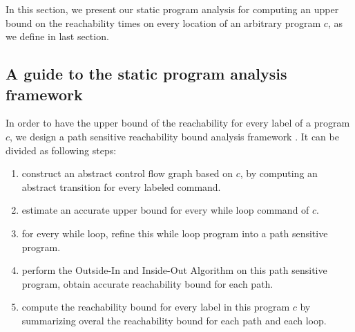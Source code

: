 In this section, we present our static program analysis for computing an upper bound on the 
reachability times on every location of an arbitrary program $c$, as we define in last section.
%
\subsection{A guide to the static program analysis framework}
In order to have the upper bound of the  reachability for every label of a program $c$, we design 
a path sensitive reachability bound analysis framework {\THESYSTEM}.
It can be divided as following steps: 
%
%
\begin{enumerate}
\item  construct an abstract control flow graph based on $c$, by computing an abstract transition 
for every labeled command.
\item estimate an accurate upper bound for every while loop command of $c$.
\item for every while loop, refine this while loop program into a path sensitive program.
\item perform the Outside-In and Inside-Out Algorithm on this path sensitive program, obtain 
accurate reachability bound for each path.
\item compute the reachability bound for every label in this program $c$ by summarizing overal the reachability bound for
each path and each loop.
\end{enumerate}

